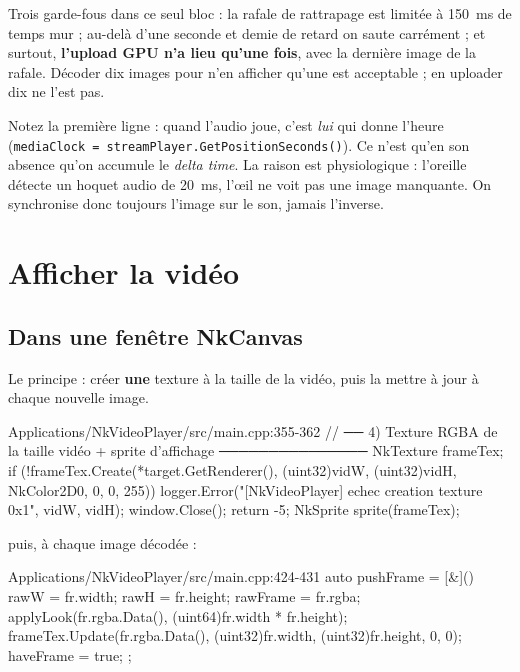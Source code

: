 Trois garde-fous dans ce seul bloc : la rafale de rattrapage est limitée à
150~ms de temps mur ; au-delà d'une seconde et demie de retard on saute
carrément ; et surtout, \textbf{l'upload GPU n'a lieu qu'une fois}, avec la
dernière image de la rafale. Décoder dix images pour n'en afficher qu'une est
acceptable ; en uploader dix ne l'est pas.

\begin{nkretenir}
Notez la première ligne : quand l'audio joue, c'est \emph{lui} qui donne
l'heure (\texttt{mediaClock = streamPlayer.GetPositionSeconds()}). Ce n'est
qu'en son absence qu'on accumule le \emph{delta time}. La raison est
physiologique : l'oreille détecte un hoquet audio de 20~ms, l'œil ne voit pas
une image manquante. On synchronise donc toujours l'image sur le son, jamais
l'inverse.
\end{nkretenir}

\section{Afficher la vidéo}

\subsection{Dans une fenêtre NkCanvas}

Le principe : créer \textbf{une} texture à la taille de la vidéo, puis la mettre
à jour à chaque nouvelle image.

\begin{nkcode}{Applications/NkVideoPlayer/src/main.cpp:355-362}
    // ── 4) Texture RGBA de la taille vidéo + sprite d'affichage ───────────────
    NkTexture frameTex;
    if (!frameTex.Create(*target.GetRenderer(), (uint32)vidW, (uint32)vidH, NkColor2D{0, 0, 0, 255})) {
        logger.Error("[NkVideoPlayer] echec creation texture {0}x{1}", vidW, vidH);
        window.Close();
        return -5;
    }
    NkSprite sprite(frameTex);
\end{nkcode}

puis, à chaque image décodée :

\begin{nkcode}{Applications/NkVideoPlayer/src/main.cpp:424-431}
    auto pushFrame = [&]() {
        rawW = fr.width;
        rawH = fr.height;
        rawFrame = fr.rgba;
        applyLook(fr.rgba.Data(), (uint64)fr.width * fr.height);
        frameTex.Update(fr.rgba.Data(), (uint32)fr.width, (uint32)fr.height, 0, 0);
        haveFrame = true;
    };
\end{nkcode}

